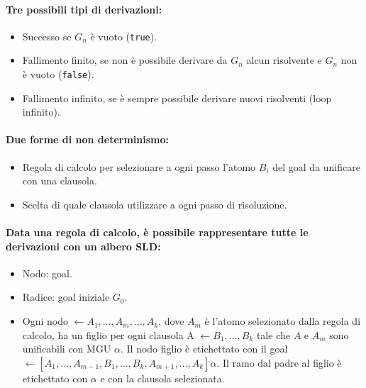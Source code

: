 \paragraph{Tre possibili tipi di derivazioni:}

\begin{itemize}
  \item Successo se $G_n$ è vuoto (\texttt{true}). 
  \item Fallimento finito, se non è possibile derivare da $G_n$ alcun risolvente e $G_n$ non è vuoto (\texttt{false}).
  \item Fallimento infinito, se è sempre possibile derivare nuovi risolventi (loop infinito).
\end{itemize}

\paragraph{Due forme di non determinismo:}

\begin{itemize}
  \item Regola di calcolo per selezionare a ogni passo l’atomo $B_i$
del goal da unificare con una clausola. 
\item Scelta di quale clausola utilizzare a ogni passo di
risoluzione. 
\end{itemize}




\paragraph{Data una regola di calcolo, è possibile rappresentare tutte le
derivazioni con un albero SLD:}

\begin{itemize}
  \item Nodo: goal. 
  \item Radice: goal iniziale $G_0$. 
  \item Ogni nodo $\leftarrow A_1, \dots, A_m, \dots, A_k$, dove $A_m$ è l’atomo
selezionato dalla regola di calcolo, ha un figlio per ogni
clausola A $\leftarrow B_1, \dots, B_k$ tale che $A$ e $A_m$ sono unificabili con
MGU $\alpha$. Il nodo figlio è etichettato con il goal $\leftarrow [A_1, \dots, A_{m-1}, B_1, \dots, B_k, A_{m+1}, \dots, A_k] \alpha$. Il ramo dal padre al figlio è
etichettato con $\alpha$ e con la clausola selezionata.
\end{itemize}

